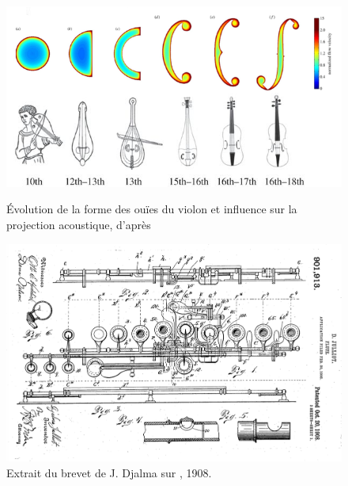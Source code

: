 \begin{figure}[!htbp]
	\captionsetup{format=plain}%
	\centering
	\begin{minipage}[t]{0.48\textwidth}
		\includegraphics[width=\linewidth]{gfx/06_visual_representation/f-hole.png}
		\caption[Évolution de la forme des ouïes du violon et projection acoustique]{Évolution de la forme des ouïes du violon et influence sur la projection acoustique, d'après \cite{nia_evolution_2015}}
		\label{fig:visual_representation:fhole}
	\end{minipage}
	\hspace{.02\linewidth}
	\begin{minipage}[t]{0.48\textwidth}
	    \includegraphics[width=\linewidth]{gfx/06_visual_representation/Julliot_patent.png}
		\caption[Brevet sur l'amélioration du clétage des flûtes de Boehm]{Extrait du brevet de J. Djalma sur , 1908.}
		\label{fig:visual_representation:boehm}
	\end{minipage}
\end{figure}



